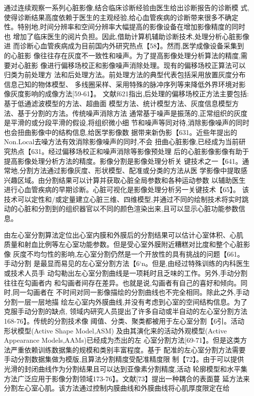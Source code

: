 通过连续观察一系列心脏影像,结合临床诊断经验由医生给出诊断报告的诊断模
式,使得诊断结果高度依赖于医生的主观经验,给心血管疾病的诊断带来很多不确定
性。特别地,时间分辨率和空间分辨率大幅提高的影像设备在增加影像精度的同时也
增加了临床医生的阅片负担。因此,借助计算机辅助诊断技术,处理分析心脏影像进
而诊断心血管疾病成为目前国内外研究热点【58】。然而,医学成像设备采集到的心脏影
像往往存在灰度不一致性和噪声。为了提高影像处理分析算法的精度,需要对心脏影
像进行偏移场校正和影像噪声消除处理。现有的偏移场校正算法可以归类为前处理方
法和后处理方法。前处理方法的典型代表包括采用放置灰度分布信息己知的物体模型、
多线圈采样、采用特殊的脉冲序列等来降低外界环境对影像灰度影响的成像方法[59-61】。
文献f621指出,后处理的偏移场校正方法主要包括:基于低通滤波模型的方法、超曲面
模型方法、统计模型方法、灰度信息模型方法、基于分割的方法。传统噪声消除方法
通常基于噪声是振荡的,正常组织的灰度是平滑的或分段平滑的假设,将组织微小细
节和噪声等同对待,消除影像噪声的同时也会扭曲影像中的结构信息,给医学影像数
据带来新伪影【631。近些年提出的Non.Local去噪方法有效消除影像噪声的同时,不会
扭曲心脏影像,已经成为当前研究热点【631。经过偏移场校正和噪声消除等影像预处理
后的心脏影像影像有助于提高影像处理分析方法的精度。影像分割是影像处理分析关
键技术之一【641。通常地,分割方法通过影像灰度、形状模型、配准或分类的方法从医
学影像中提取感兴趣区域。由分割结果可以计算并获取心脏全局参数和各种运动参数
以辅助医生进行心血管疾病的早期诊断。心脏可视化是影像处理分析另一关键技术【65】。
该技术可以定性和/或定量建立心脏三维、四维模型,并通过不同的绘制技术将实时跳
动的心脏和分割到的组织器官以不同的颜色渲染出来,且可以显示心脏功能参数信息。


由左心室分割算法定位出心室内膜和外膜后的分割结果可以估计心室体积、心肌
质量和射血比例等左心室功能参数。但是受心室外膜附近糟糕对比度和整个心脏影像
灰度不均匀性的影响,左心室分割仍然是一个开放性的具有挑战的问题【661。手动分割
是最显而易见的左心室分割方法【6‘n。但是,由经过特殊训练的内科医生或技术人员手
动勾勒出左心室分割曲线是一项耗时且乏味的工作。另外,手动分割往往在勾画者内
和勾画者间存在差异。也就是说,勾画者有自己的喜好和倾向。同时,同一勾画者在
不时间对同一影像描绘的分割曲线也不完全相同。除此之外,手动分割一层一层地描
绘左心室内外膜曲线,并没有考虑到心室的空间结构信息。为了克服手动分割的缺点,
领域内研究人员提出了许多自动或半自动的左心室分割方法168-76】。传统的分割技术像
阈值、分类、聚类都被用于左心室分割【6引。活动形状模型(Active
 Shape Model,ASM)
 及由其演化来的活动外观模型(Active
  Appearance
   Models,AAMs)已经成为杰出的左
   心室分割方法[69-71】。但是这类方法严重依赖训练数据集的规模和类别丰富程度。基于
   配准的左心室分割方法需要手动分割数据集做为模版,且算法分割精度受配准精度限
   制【72】。由于可以提供光滑的封闭曲线作为分割结果且可以达到亚像素分割精度,活动
   轮廓模型和水平集方法广泛应用于影像分割领域173-76】。文献[73】提出一种耦合的表面蔓
   延方法来分割左心室心肌。该方法通过控制内膜曲线和外膜曲线将心肌厚度限定在给

